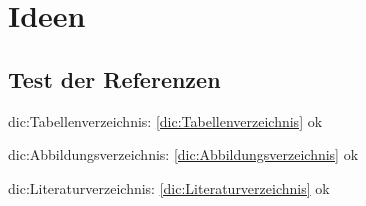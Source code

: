 

\chapter{Ideen}%
\label{cha:Ideen}

\section{Test der Referenzen}
\label{sec:Referenzen}

dic:Tabellenverzeichnis:   \vref{dic:Tabellenverzeichnis}   ok

dic:Abbildungsverzeichnis: \vref{dic:Abbildungsverzeichnis} ok

dic:Literaturverzeichnis:  \vref{dic:Literaturverzeichnis}  ok

\Endchapter
